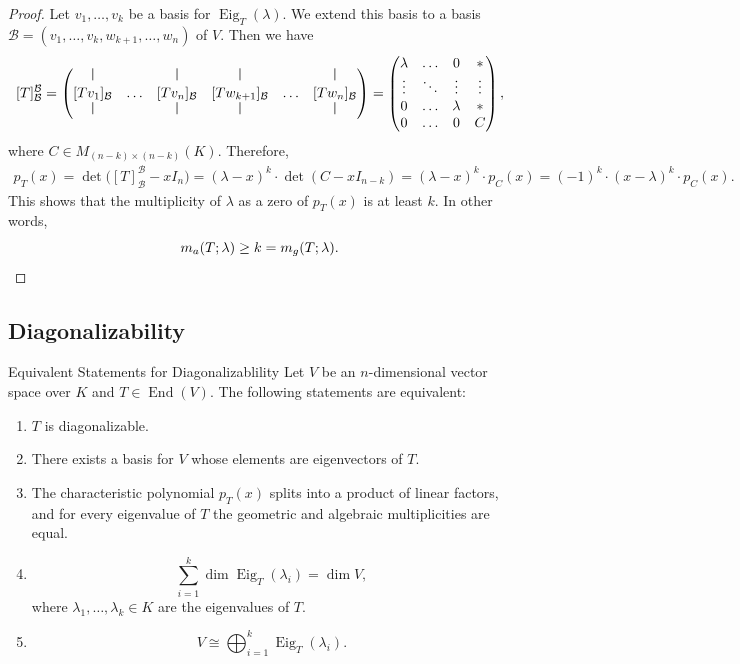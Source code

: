 \begin{proof}
	Let $v_1,\hdots, v_k$ be a basis for $\operatorname{Eig}_T(\lambda)$. We extend this basis to a basis $\mathcal{B} = (v_1, \hdots , v_k, w_{k+1}, \hdots, w_n)$ of $V$. Then we have
	\[
		[T]^{\mathcal{B}}_{\mathcal{B}} = \begin{pmatrix}
			\rule{0.5pt}{2ex} & & \rule{0.5pt}{2ex} & \rule{0.5pt}{2ex} & & \rule{0.5pt}{2ex}\\
			[Tv_1]_{\mathcal{B}} & \hdots & [Tv_n]_{\mathcal{B}} & [Tw_{k+1}]_{\mathcal{B}} & \hdots & [Tw_n]_{\mathcal{B}}\\
			\rule{0.5pt}{2ex} & & \rule{0.5pt}{2ex} & \rule{0.5pt}{2ex} & & \rule{0.5pt}{2ex}
		\end{pmatrix}
		=
		\begin{pmatrix}
			\lambda & \hdots & 0 & \ast \\
			\vdots & \ddots & \vdots & \vdots \\
			0 & \hdots & \lambda & \ast \\
			0 & \hdots & 0 & C
		\end{pmatrix},
	\]
	where $C \in M_{(n-k) \times (n-k)}(K)$. Therefore,
	\begin{align*}
		p_T(x) = \det\big([T]^{\mathcal{B}}_{\mathcal{B}} - x I_n\big) = (\lambda - x)^k \cdot \det(C - x I_{n-k}) = (\lambda - x)^k \cdot p_C(x) = (-1)^k\cdot (x - \lambda)^k \cdot p_C(x).
	\end{align*}
	This shows that the multiplicity of $\lambda$ as a zero of $p_T(x)$ is at least $k$. In other words,
	\[
		m_a(T;\lambda) \geq k = m_g(T;\lambda). \qedhere
	\]
\end{proof}

\subsection{Diagonalizability}

\begin{theorem}{Equivalent Statements for Diagonalizablility}
	Let $V$ be an $n$-dimensional vector space over $K$ and $T \in \operatorname{End}(V)$. The following statements are equivalent:
	\begin{enumerate}
		\item $T$ is diagonalizable.
		\item There exists a basis for $V$ whose elements are eigenvectors of $T$.
		\item The characteristic polynomial $p_T(x)$ splits into a product of linear factors, and for every eigenvalue of $T$ the geometric and algebraic multiplicities are equal.
		\item \[
			\sum_{i=1}^{k} \dim \operatorname{Eig}_T(\lambda_i) = \dim V, 
		\]
		where $\lambda_1, \hdots , \lambda_k \in K$ are the eigenvalues of $T$.
		\item 
		\[
			V \cong \bigoplus_{i = 1}^{k} \operatorname{Eig}_T(\lambda_i).
		\]
	\end{enumerate}
\end{theorem}

